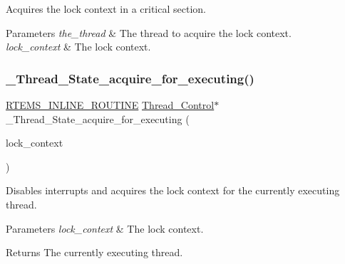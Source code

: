 Acquires the lock context in a critical section. 


\begin{DoxyParams}{Parameters}
{\em the\+\_\+thread} & The thread to acquire the lock context. \\
\hline
{\em lock\+\_\+context} & The lock context. \\
\hline
\end{DoxyParams}
\mbox{\label{group__RTEMSScoreThread_ga21404c6b38c1c88748cec78a4bbd25f1}} 
\subsubsection{\texorpdfstring{\_Thread\_State\_acquire\_for\_executing()}{\_Thread\_State\_acquire\_for\_executing()}}
{\footnotesize\ttfamily \mbox{\hyperlink{group__RTEMSScoreBaseDefs_gac216239df231d5dbd15e3520b0b9313f}{R\+T\+E\+M\+S\+\_\+\+I\+N\+L\+I\+N\+E\+\_\+\+R\+O\+U\+T\+I\+NE}} \mbox{\hyperlink{struct__Thread__Control}{Thread\+\_\+\+Control}}$\ast$ \+\_\+\+Thread\+\_\+\+State\+\_\+acquire\+\_\+for\+\_\+executing (\begin{DoxyParamCaption}\item[{\mbox{\hyperlink{structISR__lock__Context}{I\+S\+R\+\_\+lock\+\_\+\+Context}} $\ast$}]{lock\+\_\+context }\end{DoxyParamCaption})}



Disables interrupts and acquires the lock context for the currently executing thread. 


\begin{DoxyParams}{Parameters}
{\em lock\+\_\+context} & The lock context.\\
\hline
\end{DoxyParams}
\begin{DoxyReturn}{Returns}
The currently executing thread. 
\end{DoxyReturn}
\mbox{\label{group__RTEMSScoreThread_ga958218590f858b65855c89802b2cc071}} 
